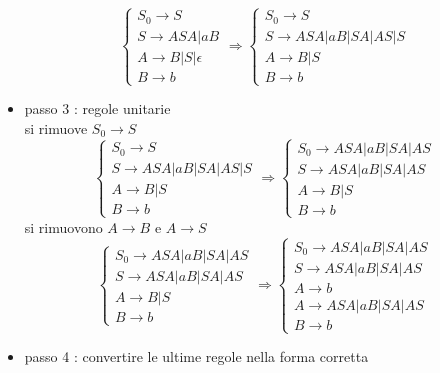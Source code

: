 \documentclass[10pt, letterpaper]{report}
\begin{document}
\begin{itemize}
$$\begin{cases}
        S_0 \longrightarrow S\\
        S\longrightarrow ASA |  aB  \\ 
        A \longrightarrow B| S  | \epsilon \\ 
        B \longrightarrow b
    \end{cases}\Longrightarrow 
    \begin{cases}
        S_0 \longrightarrow S\\
        S\longrightarrow ASA |  aB | SA |AS | S  \\ 
        A \longrightarrow B| S \\ 
        B \longrightarrow b
    \end{cases}$$
\item passo 3 : regole unitarie
\\ si rimuove $S_0\longrightarrow S$
$$\begin{cases}
    S_0 \longrightarrow S\\
    S\longrightarrow ASA |  aB | SA |AS | S  \\ 
    A \longrightarrow B| S \\ 
    B \longrightarrow b
\end{cases}\Longrightarrow 
\begin{cases}
    S_0 \longrightarrow ASA |  aB | SA |AS \\
    S\longrightarrow ASA |  aB | SA |AS   \\ 
    A \longrightarrow B| S \\ 
    B \longrightarrow b
\end{cases}$$
si rimuovono $A\longrightarrow B$ e $A\longrightarrow S$
$$ 
\begin{cases}
    S_0 \longrightarrow ASA |  aB | SA |AS \\
    S\longrightarrow ASA |  aB | SA |AS   \\ 
    A \longrightarrow B| S \\ 
    B \longrightarrow b
\end{cases}
\Longrightarrow 
\begin{cases}
    S_0 \longrightarrow ASA |  aB | SA |AS \\
    S\longrightarrow ASA |  aB | SA |AS   \\ 
    A \longrightarrow b \\
    A\longrightarrow ASA |  aB | SA |AS \\ 
    B \longrightarrow b
\end{cases}
$$
\item passo 4 : convertire le ultime regole nella forma corretta $$
$$
\end{itemize}
\end{document}
